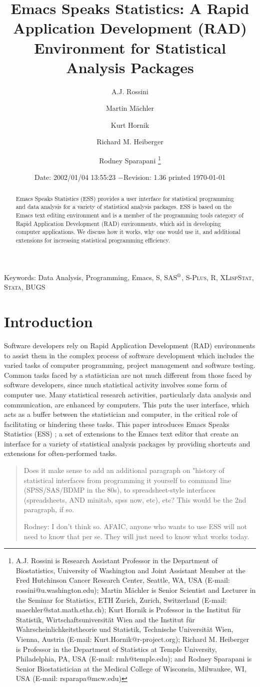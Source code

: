\documentclass{article}
\title{Emacs Speaks Statistics:  A Rapid Application Development (RAD)
  Environment for Statistical Analysis Packages}
\author{A.J. Rossini \and Martin M{\"a}chler \and Kurt Hornik \and Richard
  M. Heiberger \and Rodney Sparapani \footnote{%
    A.J. Rossini is Research Assistant Professor in the Department of
    Biostatistics, University of Washington and Joint Assistant Member at
    the Fred Hutchinson Cancer Research Center, Seattle, WA, USA
    (E-mail: rossini@u.washington.edu);
    Martin M{\"a}chler is Senior Scientist and Lecturer in the Seminar for
    Statistics, ETH Zurich, Zurich, Switzerland
    (E-mail: maechler@stat.math.ethz.ch);
    Kurt Hornik is Professor in the Institut f{\"u}r Statistik,
    Wirtschaftsuniversit{\"a}t Wien and the Institut f{\"u}r
    Wahrscheinlichkeitstheorie und Statistik, Technische Universit{\"a}t
    Wien, Vienna, Austria (E-mail: Kurt.Hornik@r-project.org);
    Richard M. Heiberger is Professor in the Department of Statistics at
    Temple University, Philadelphia, PA, USA (E-mail: rmh@temple.edu);
    and Rodney Sparapani is Senior Biostatistician at the Medical College
    of Wisconsin, Milwaukee, WI, USA (E-mail: rsparapa@mcw.edu)}}
\date{$ $Date: 2002/01/04 13:55:23 $ - $Revision: 1.36 $ $\tiny printed \today}
\newcommand*{\SAS}{\textsc{SAS}$^{\mbox{\scriptsize\textregistered}}$}
\newcommand*{\Splus}{\textsc{S-Plus}}
\newcommand*{\XLispStat}{\textsc{XLispStat}}
\newcommand*{\Stata}{\textsc{Stata}}
\begin{document}
\maketitle

\begin{abstract}
  Emacs Speaks Statistics (ESS) provides a user interface for
  statistical programming and data analysis for a variety
  of statistical analysis packages.  ESS
  is based on the Emacs text editing environment and is a member of
  the programming tools category of Rapid Application
  Development (RAD) environments, which aid in developing
  computer applications.  We discuss how it works, why one
  would use it, and additional extensions for increasing
  statistical programming efficiency.
\end{abstract}

\noindent Keywords: Data Analysis, Programming, Emacs, S, \SAS,
\Splus, R, \XLispStat, \Stata, BUGS


\section{Introduction}
\label{sec:introduction}

Software developers rely on Rapid Application Development (RAD)
environments to assist them in the complex process of software
development which includes the varied tasks of computer
programming, project management and software testing.
Common tasks faced by a statistician are not much different from those
faced by software developers, since much statistical
activity involves some form of computer use.  Many
statistical research activities, particularly data analysis and
communication, are enhanced by computers.  This puts the user
interface, which acts as a buffer between the statistician and
computer, in the critical role of facilitating or hindering these
tasks.  This paper introduces Emacs Speaks Statistics (ESS) \citep{ESS};
a set of extensions to the Emacs text editor that create an interface
for a variety of statistical analysis packages by
providing shortcuts and extensions for often-performed tasks.

\begin{quote}
 Does it make sense to add an additional paragraph on "history of
statistical interfaces from programming it yourself to command line
(SPSS/SAS/BDMP in the 80s), to spreadsheet-style interfaces
(spreadsheets, AND minitab, spss now, etc), etc?  This would be the
2nd paragraph, if so.

Rodney:  I don't think so.
AFAIC, anyone who wants to use ESS will not need to know
that per se.  They will just need to know what works today.
\end{quote}
\end{document}
